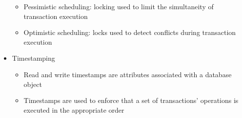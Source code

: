 \documentclass{report}
\begin{document}
\begin{itemize}
    \begin{itemize}
        \item Pessimistic scheduling: locking used to limit the simultaneity of transaction execution
        \item Optimistic scheduling: locks used to detect conflicts during transaction execution
    \end{itemize}
    \item Timestamping
    \begin{itemize}
        \item Read and write timestamps are attributes associated with a database object
        \item Timestamps are used to enforce that a set of transactions’ operations is executed in the appropriate order
    \end{itemize}
\end{itemize}
\end{document}
